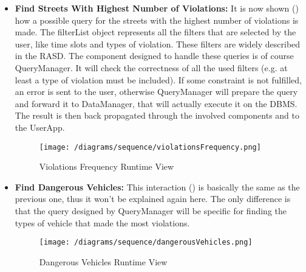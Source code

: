 			\begin{itemize}
				\item \textbf{Find Streets With Highest Number of Violations:} It is now shown () how a possible query for the streets with the highest number of violations is made. The filterList object represents all the filters that are selected by the user, like time slots and types of violation. These filters are widely described in the RASD. The component designed to handle these queries is of course QueryManager. It will check the correctness of all the used filters (e.g. at least a type of violation must be included). If some constraint is not fulfilled, an error is sent to the user, otherwise QueryManager will prepare the query and forward it to DataManager, that will actually execute it on the DBMS. The result is then back propagated through the involved components and to the UserApp.
				
				\begin{figure}[h!]
					\centering
					\texttt{[image: /diagrams/sequence/violationsFrequency.png]}
					\caption{\label{fig:violationsFrequencyRuntime} Violations Frequency Runtime View}
				\end{figure}
			
				\item \textbf{Find Dangerous Vehicles:} This interaction () is basically the same as the previous one, thus it won't be explained again here. The only difference is that the query designed by QueryManager will be specific for finding the types of vehicle that made the most violations.
				
				\begin{figure}[h!]
					\centering
					\texttt{[image: /diagrams/sequence/dangerousVehicles.png]}
					\caption{\label{fig:dangerousVehiclesRuntime} Dangerous Vehicles Runtime View}
				\end{figure}
			

\end{itemize}
